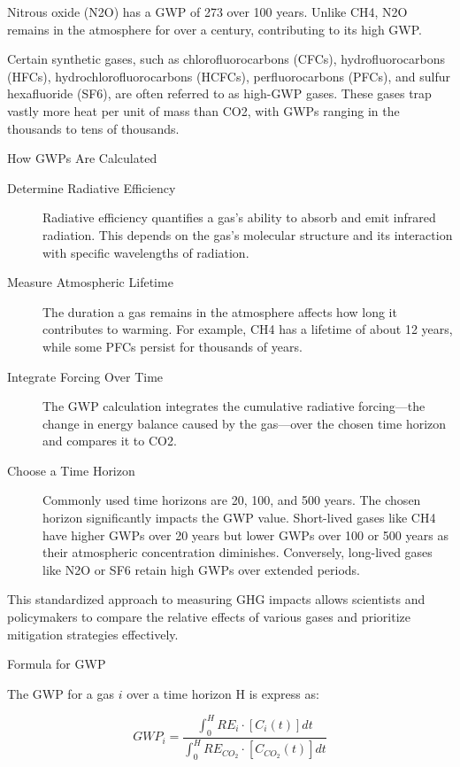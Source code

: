 \documentclass{tufte-handout}\usepackage[]{graphicx}\usepackage[]{xcolor}
\begin{document}
Nitrous oxide (N2O) has a GWP of 273 over 100 years. Unlike CH4, N2O remains in the atmosphere for over a century, contributing to its high GWP.

Certain synthetic gases, such as chlorofluorocarbons (CFCs), hydrofluorocarbons (HFCs), hydrochlorofluorocarbons (HCFCs), perfluorocarbons (PFCs), and sulfur hexafluoride (SF6), are often referred to as high-GWP gases. These gases trap vastly more heat per unit of mass than CO2, with GWPs ranging in the thousands to tens of thousands.

How GWPs Are Calculated

\begin{description}
	\item[Determine Radiative Efficiency] Radiative efficiency quantifies a gas’s ability to absorb and emit infrared radiation. This depends on the gas’s molecular structure and its interaction with specific wavelengths of radiation.

	\item[Measure Atmospheric Lifetime] The duration a gas remains in the atmosphere affects how long it contributes to warming. For example, CH4 has a lifetime of about 12 years, while some PFCs persist for thousands of years.

	\item[Integrate Forcing Over Time] The GWP calculation integrates the cumulative radiative forcing—the change in energy balance caused by the gas—over the chosen time horizon and compares it to CO2.

	\item[Choose a Time Horizon] Commonly used time horizons are 20, 100, and 500 years. The chosen horizon significantly impacts the GWP value. Short-lived gases like CH4 have higher GWPs over 20 years but lower GWPs over 100 or 500 years as their atmospheric concentration diminishes. Conversely, long-lived gases like N2O or SF6 retain high GWPs over extended periods.

\end{description}

This standardized approach to measuring GHG impacts allows scientists and policymakers to compare the relative effects of various gases and prioritize mitigation strategies effectively.


Formula for GWP


The GWP for a gas $i$ over a time horizon H is express as: 

\begin{equation}
GWP_i = \frac{\int^{H}_{0}RE_i \cdot [C_i(t)]dt}{\int^{H}_{0}RE_{CO_2} \cdot [C_{CO_2}(t)]dt}
\end{equation}
\end{document}
